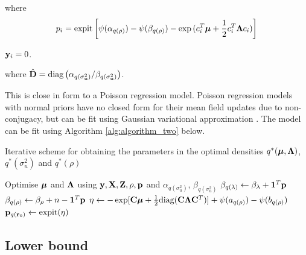 \documentclass{article}[12pt]
\begin{document}
\noindent where
$$
p_i = \text{expit} \left[ \psi{(\alpha_{q(\rho)})} - \psi{(\beta_{q(\rho)})} - \exp{(c_i^T{\boldsymbol\mu}+ {\frac{1}{2}}c_i^T {\boldsymbol\Lambda}c_i)} \right]
$$

\noindent {} ${\bf y}_i = 0$.


\noindent where $\hat{{\bf D}} = \text{diag}\left (\alpha_{q(\sigma_{{\bf u}}^2)}/\beta_{q(\sigma_{{\bf u}}^2)} \right )$. 

\noindent This is close in form to a Poisson regression model. Poisson regression models
with normal priors have no closed form for their mean field updates due to
non-conjugacy, but can be fit using Gaussian variational approximation
\citep{ormerod09}. The model can be fit using Algorithm \ref{alg:algorithm_two} below.

\begin{algorithm}\label{alg:algorithm_two}
\label{algorithm2}
\caption[Algorithm 2]{Iterative scheme for obtaining the parameters in the
optimal densities $q^*({\boldsymbol \mu}, {\boldsymbol \Lambda})$, $q^*(\sigma_u^2)$ and $q^*(\rho)$}
\begin{algorithmic}
\STATE Optimise ${\boldsymbol \mu}$ and ${\boldsymbol \Lambda}$ using ${\bf y}, {\bf X}, {\bf Z}, \rho, {\bf p}$ and
$\alpha_{q(\sigma_u^2)}$, $\beta_{q(\sigma_u^2)}$
\STATE $\beta_{q(\lambda)} \leftarrow \beta_\lambda + {\bf 1}^T{\bf p}$
\STATE $\beta_{q(\rho)} \leftarrow \beta_\rho + n - {\bf 1}^T{\bf p}$
\STATE $\eta \leftarrow -\exp [{\bf C} {\boldsymbol \mu} + {\frac{1}{2}} \text{diag}{({\bf C}{\boldsymbol\Lambda}{\bf C}^T)}] + \psi{(a_{q{(\rho)}})} - \psi{(b_{q{(\rho)}})}$
\STATE ${\bf p}_{q({\bf r}_0)} \leftarrow \text{expit} (\eta)$
\ENDWHILE
\end{algorithmic}
\end{algorithm}


\subsection{Lower bound}
\end{document}
